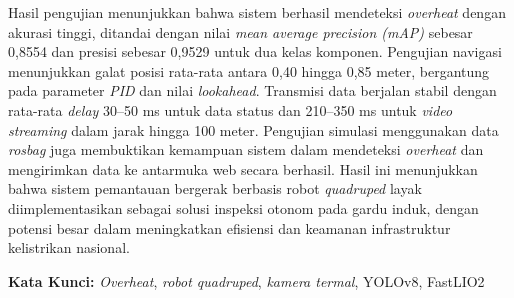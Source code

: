   Hasil pengujian menunjukkan bahwa sistem berhasil mendeteksi \emph{overheat} dengan akurasi tinggi, ditandai dengan nilai \emph{mean average precision (mAP)} sebesar 0{,}8554 dan presisi sebesar 0{,}9529 untuk dua kelas komponen. Pengujian navigasi menunjukkan galat posisi rata-rata antara 0{,}40 hingga 0{,}85 meter, bergantung pada parameter \emph{PID} dan nilai \emph{lookahead}. Transmisi data berjalan stabil dengan rata-rata \emph{delay} 30--50 ms untuk data status dan 210--350 ms untuk \emph{video streaming} dalam jarak hingga 100 meter. Pengujian simulasi menggunakan data \emph{rosbag} juga membuktikan kemampuan sistem dalam mendeteksi \emph{overheat} dan mengirimkan data ke antarmuka web secara berhasil. Hasil ini menunjukkan bahwa sistem pemantauan bergerak berbasis robot \emph{quadruped} layak diimplementasikan sebagai solusi inspeksi otonom pada gardu induk, dengan potensi besar dalam meningkatkan efisiensi dan keamanan infrastruktur kelistrikan nasional.
  

\vspace{2ex}
\noindent
\textbf{Kata Kunci:} \emph{Overheat}, \emph{robot quadruped}, \emph{kamera termal}, YOLOv8, FastLIO2
